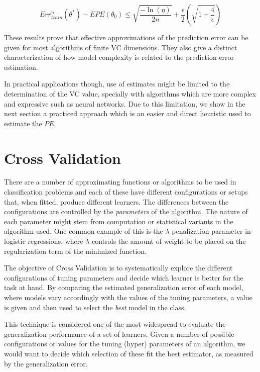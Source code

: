 \begin{equation}
Err^n_{train}(\theta^*) - EPE(\theta_0) \leq \sqrt{\frac{-\ln(\eta)}{2n} } + \frac{\epsilon}{2}\left( \sqrt{1 + \frac{4}{\epsilon} } \right)
\end{equation}\label{eq:vapnik-classificationBoundPrecise}

These results prove that effective approximations of the prediction error can be given for most algorithms of finite VC dimensions. They also give a distinct characterization of how model complexity is related to the prediction error estimation.

In practical applications though, use of estimates might be limited to the determination of the VC value, specially with algorithms which are more complex and expressive such as neural networks. Due to this limitation, we show in the next section a practiced approach which is an easier and direct heuristic used to estimate the $PE$.


\section{Cross Validation}\label{section:crossValidation}

 There are a number of approximating functions or algorithms to be used in classification problems and each of these have different configurations or setups that, when fitted, produce different learners. The differences between the configurations are controlled by the \textit{parameters} of the algorithm. The nature of each parameter might stem from computation or statistical variants in the algorithm used. One common example of this is the $\lambda$ penalization parameter in logistic regressions, where $\lambda$ controls the amount of weight to be placed on the regularization term of the minimized function.

The objective of Cross Validation is to systematically explore the different configurations of tuning parameters and decide which learner is better for the task at hand. By comparing the estimated generalization error of each model, where models vary accordingly with the values of the tuning parameters, a value is given and then used to select the \textit{best} model in the class.

This technique is considered one of the most widespread to evaluate the generalization performance of a set of learners. Given a number of possible configurations or values for the tuning (hyper) parameters of an algorithm, we would want to decide which selection of these fit the best estimator, as measured by the generalization error.

